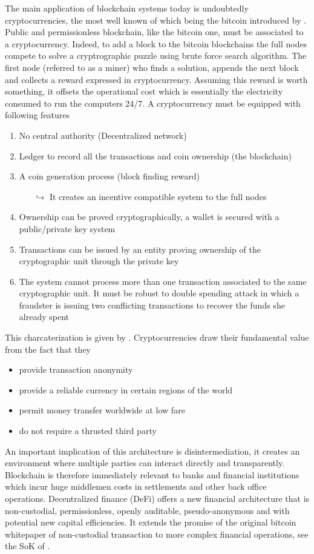 \noindent The main application of blockchain systems today is undoubtedly cryptocurrencies, the most well known of which being the bitcoin introduced by \citet{Na08}. Public and permissionless blockchain, like the bitcoin one, must be associated to a cryptocurrency. Indeed, to add a block to the bitcoin blockchains the full nodes compete to solve a cryptrographic puzzle using brute force search algorithm. The first node (referred to as a miner) who finds a solution, appends the next block and collects a reward expressed in cryptocurrency. Assuming this reward is worth something, it offsets the operational cost which is essentially the electricity consumed to run the computers 24/7. A cryptocurrency must be equipped with following features
\begin{enumerate}
  \item No central authority (Decentralized network)
  \item Ledger to record all the transactions and coin ownership (the blockchain)
  \item A coin generation process (block finding reward)
    \begin{itemize}
    \item[$\hookrightarrow$] It creates an incentive compatible system to the full nodes 
  \end{itemize}
  \item Ownership can be proved cryptographically, a wallet is secured with a public/private key system 
  \item Transactions can be issued by an entity proving ownership of the cryptographic unit through the private key
  \item The system cannot process more than one transaction associated to the same cryptographic unit. It must be robust to double spending attack in which a fraudster is issuing two conflicting transactions to recover the funds she already spent
\end{enumerate}
This charcaterization is given by \citet{Lansky2018}.
Cryptocurrencies draw their fundamental value from the fact that they 
\begin{itemize}
  \item provide transaction anonymity
  \item provide a reliable currency in certain regions of the world
  \item permit money transfer worldwide at low fare
  \item do not require a thrusted third party
\end{itemize} 
An important implication of this architecture is disintermediation, it creates an environment where
multiple parties can interact directly and transparently. Blockchain is therefore immediately relevant
to banks and financial institutions which incur huge middlemen costs in settlements and other back office operations. Decentralized finance (DeFi) offers a new financial architecture that is non-custodial, permissionless, openly auditable, pseudo-anonymous and with potential new capital efficiencies. It extends the promise of the original bitcoin whitepaper \citet{Na08} of non-custodial transaction
to more complex financial operations, see the SoK of \citet{werner2021sok}.\\

